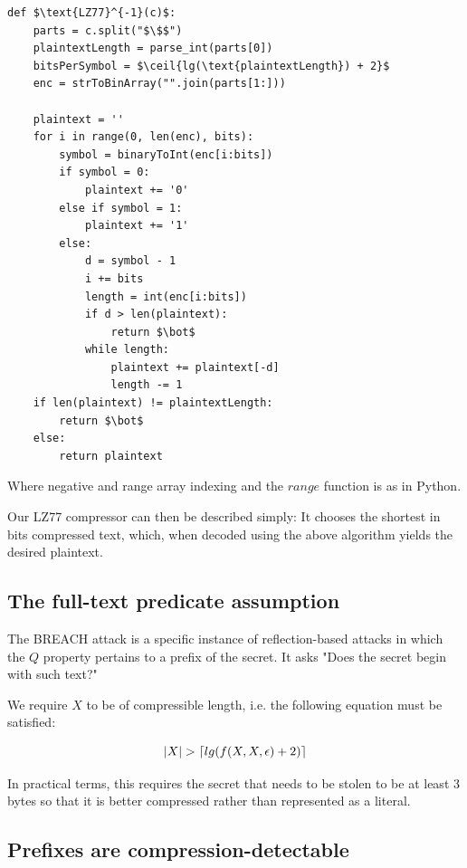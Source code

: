 \documentclass{sig-alternate-05-2015}
\DeclarePairedDelimiter{\ceil}{\lceil}{\rceil}
\begin{document}
\begin{lstlisting}[texcl,mathescape]
def $\text{LZ77}^{-1}(c)$:
    parts = c.split("$\$$")
    plaintextLength = parse_int(parts[0])
    bitsPerSymbol = $\ceil{lg(\text{plaintextLength}) + 2}$
    enc = strToBinArray("".join(parts[1:]))

    plaintext = ''
    for i in range(0, len(enc), bits):
        symbol = binaryToInt(enc[i:bits])
        if symbol = 0:
            plaintext += '0'
        else if symbol = 1:
            plaintext += '1'
        else:
            d = symbol - 1
            i += bits
            length = int(enc[i:bits])
            if d > len(plaintext):
                return $\bot$
            while length:
                plaintext += plaintext[-d]
                length -= 1
    if len(plaintext) != plaintextLength:
        return $\bot$
    else:
        return plaintext
\end{lstlisting}

Where negative and range array indexing and the $range$ function is as in
Python.

Our LZ77 compressor can then be described simply: It chooses the shortest in
bits compressed text, which, when decoded using the above algorithm yields the
desired plaintext.


\subsection{The full-text predicate assumption}\label{subsec:fulltextassumption}

The BREACH attack is a specific instance of reflection-based attacks in which
the $Q$ property pertains to a prefix of the secret. It asks "Does the secret
begin with such text?"

We require $X$ to be of compressible length,
i.e. the following equation must be satisfied:

\begin{equation*}
    |X| > \ceil{lg(f(X, X, \epsilon) + 2)}
\end{equation*}

In practical terms, this requires the secret that needs to be stolen to be at
least 3 bytes so that it is better compressed rather than represented as a
literal.

\subsection{Prefixes are
compression-detectable}\label{subsec:breachprefix}
\end{document}
